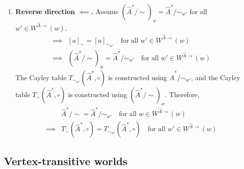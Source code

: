 \begin{proofE}
\begin{enumerate}[(1)]
    \item \textbf{Reverse direction $\impliedby$.}
    Assume $(\hat{A}^{*}/\sim)_{w} = \hat{A}^{*}/\sim_{w'}$ for all $w' \in W^{\hat{A}\to}(w)$.
    \begin{align}
        \implies & [a]_{\sim} = [a]_{\sim_{w'}} \quad \text{for all $w' \in W^{\hat{A}\to}(w)$} \\
        \implies & (\hat{A}^{*}/\sim)_{w} = \hat{A}^{*}/\sim_{w'} \quad \text{for all $w' \in W^{\hat{A}\to}(w)$}
    \end{align}
    The Cayley table $T_{\sim_{w'}}(\hat{A}^{*}, \circ)$ is constructed using $\hat{A}^{*}/\sim_{w'}$, and the Cayley table $T_{\sim}(\hat{A}^{*}, \circ)$ is constructed using $(\hat{A}^{*}/\sim)_{w}$.
    Therefore,
    \begin{align}
        & \hat{A}^{*}/\sim = \hat{A}^{*}/\sim_{w'} \quad \text{for all $w \in W^{\hat{A}\to}(w)$} \\
        \implies & T_{\sim}(\hat{A}^{*}, \circ) = T_{\sim_{w'}}(\hat{A}^{*}, \circ) \quad \text{for all $w' \in W^{\hat{A}\to}(w)$}
    \end{align}
\end{enumerate}
\end{proofE}


\subsection{
Vertex-transitive worlds
}

